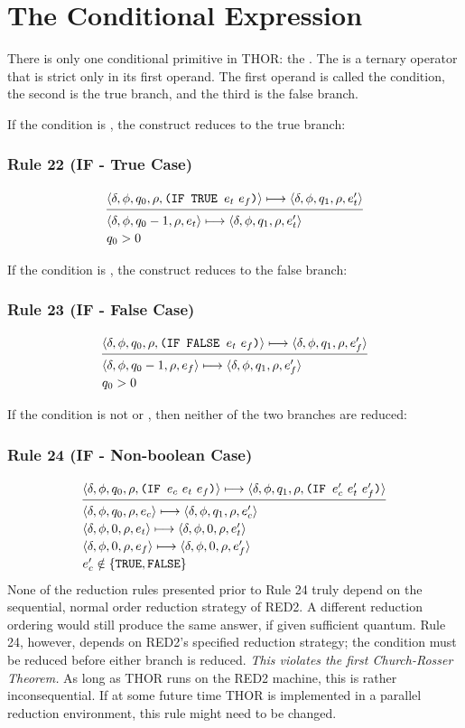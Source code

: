 \section{The Conditional Expression}

There is only one conditional primitive in THOR: the . The 
is a ternary operator that is strict only in its first operand. The first
operand is called the condition, the second is the true branch, and the third is
the false branch.

If the condition is , the  construct reduces to the true
branch:

\subsubsection*{Rule 22 (IF - True Case)}
\[
\semanticrule{
\cfg{\delta}{\phi}{q_0}{\rho}{\THOR{(IF TRUE }e_t\ e_f\THOR{)}}\redsto
\cfg{\delta}{\phi}{q_1}{\rho}{e'_t}
}{
\cfg{\delta}{\phi}{q_0-1}{\rho}{e_t}\redsto
\cfg{\delta}{\phi}{q_1}{\rho}{e'_t}\\
q_0>0
}
\]

If the condition is , the  construct reduces to the false
branch:

\subsubsection*{Rule 23 (IF - False Case)}
\[
\semanticrule{
\cfg{\delta}{\phi}{q_0}{\rho}{\THOR{(IF FALSE }e_t\ e_f\THOR{)}}\redsto
\cfg{\delta}{\phi}{q_1}{\rho}{e'_f}
}{
\cfg{\delta}{\phi}{q_0-1}{\rho}{e_f}\redsto
\cfg{\delta}{\phi}{q_1}{\rho}{e'_f}\\
q_0>0
}
\]

If the condition is not  or , then neither of the two
branches are reduced:

\subsubsection*{Rule 24 (IF - Non-boolean Case)}
\[
\semanticrule{
\cfg{\delta}{\phi}{q_0}{\rho}{\THOR{(IF }e_c\ e_t\ e_f\THOR{)}}\redsto
\cfg{\delta}{\phi}{q_1}{\rho}{\THOR{(IF }e'_c\ e'_t\ e'_f\THOR{)}}
}{
\cfg{\delta}{\phi}{q_0}{\rho}{e_c}\redsto
\cfg{\delta}{\phi}{q_1}{\rho}{e'_c}\\
\cfg{\delta}{\phi}{0}{\rho}{e_t}\redsto
\cfg{\delta}{\phi}{0}{\rho}{e'_t}\\
\cfg{\delta}{\phi}{0}{\rho}{e_f}\redsto
\cfg{\delta}{\phi}{0}{\rho}{e'_f}\\
e'_c\notin\{\THOR{TRUE},\THOR{FALSE}\}
}
\]
None of the reduction rules presented prior to Rule 24 truly depend on the
sequential, normal order reduction strategy of RED2. A different reduction
ordering would still produce the same answer, if given sufficient quantum. Rule
24, however, depends on RED2's specified reduction strategy; the condition must
be reduced before either branch is reduced. \emph{This violates the first Church-Rosser Theorem.} As long as THOR runs on the RED2 machine, this is rather
inconsequential. If at some future time THOR is implemented in a parallel
reduction environment, this rule might need to be changed.

